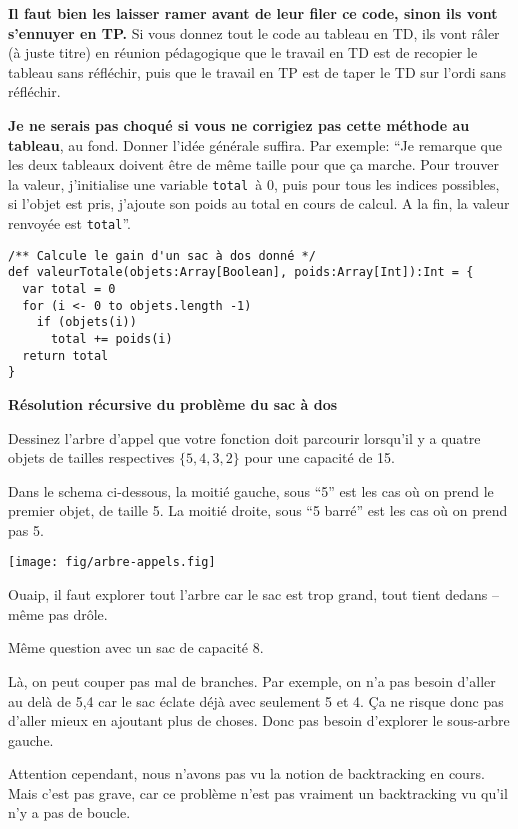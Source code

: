 \documentclass[10pt]{article}\usepackage[nu]{esial}
\begin{document}
\begin{Reponse}
  \textbf{Il faut bien les laisser ramer avant de leur filer ce code, sinon ils
    vont s'ennuyer en TP.} Si vous donnez tout le code au tableau en TD, ils
  vont râler (à juste titre) en réunion pédagogique que le travail en TD est de
  recopier le tableau sans réfléchir, puis que le travail en TP est de taper le
  TD sur l'ordi sans réfléchir.

  \textbf{Je ne serais pas choqué si vous ne corrigiez pas cette méthode au
    tableau}, au fond. Donner l'idée générale suffira. Par exemple: ``Je
  remarque que les deux tableaux doivent être de même taille pour que ça
  marche. Pour trouver la valeur, j'initialise une variable \texttt{total }à 0,
  puis pour tous les indices possibles, si l'objet est pris, j'ajoute son poids
  au total en cours de calcul. A la fin, la valeur renvoyée est
  \texttt{total}''.
\begin{Verbatim}
/** Calcule le gain d'un sac à dos donné */
def valeurTotale(objets:Array[Boolean], poids:Array[Int]):Int = {
  var total = 0
  for (i <- 0 to objets.length -1)
    if (objets(i)) 
      total += poids(i)
  return total
}  
\end{Verbatim}
\end{Reponse}

\Exercice\textbf{Résolution récursive du problème du sac à dos}

\Question Dessinez l'arbre d'appel que votre fonction doit parcourir lorsqu'il
y a quatre objets de tailles respectives $\{ 5, 4, 3, 2 \}$ pour une capacité
de 15.

\begin{Reponse}
  Dans le schema ci-dessous, la moitié gauche, sous ``5'' est les cas où on
  prend le premier objet, de taille 5. La moitié droite, sous ``5 barré'' est
  les cas où on prend pas 5.

  \texttt{[image: fig/arbre-appels.fig]}  

  Ouaip, il faut explorer tout l'arbre car le sac est trop grand, tout tient
  dedans -- même pas drôle.
\end{Reponse}

\Question Même question avec un sac de capacité 8.

\begin{Reponse}
  Là, on peut  couper pas mal de branches. Par exemple, on n'a pas besoin d'aller au
  delà de 5,4 car le sac éclate déjà avec seulement 5 et 4. Ça ne risque donc
  pas d'aller mieux en ajoutant plus de choses. Donc pas besoin d'explorer le
  sous-arbre gauche.

  Attention cependant, nous n'avons pas vu la notion de backtracking en
  cours. Mais c'est pas grave, car ce problème n'est pas vraiment un
  backtracking vu qu'il n'y a pas de boucle.
\end{Reponse}
\end{document}
